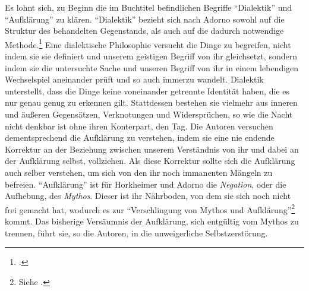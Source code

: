 \documentclass[a4paper, 12pt]{article}
\begin{document}
\begin{onehalfspace}
Es lohnt sich, zu Beginn die im Buchtitel befindlichen Begriffe "`Dialektik"' und "`Aufklärung"' zu klären. "`Dialektik"' bezieht sich nach Adorno sowohl auf die Struktur des behandelten Gegenstands, als auch auf die dadurch notwendige Methode.\footnote{\Cite[Vgl.][S. 9]{dialektik}.} Eine dialektische Philosophie versucht die Dinge zu begreifen, nicht indem sie sie definiert und unserem geistigen Begriff von ihr gleichsetzt, sondern indem sie die untersuchte Sache und unseren Begriff von ihr in einem lebendigen Wechselspiel aneinander prüft und so auch immerzu wandelt. Dialektik unterstellt, dass die Dinge keine voneinander getrennte Identität haben, die es nur genau genug zu erkennen gilt. Stattdessen bestehen sie vielmehr aus inneren und äußeren Gegensätzen, Verknotungen und Widersprüchen, so wie die Nacht nicht denkbar ist ohne ihren Konterpart, den Tag. Die Autoren versuchen dementsprechend die Aufklärung zu verstehen, indem sie eine nie endende Korrektur an der Beziehung zwischen unserem Verständnis von ihr und dabei an der Aufklärung selbst, vollziehen. Als diese Korrektur sollte sich die Aufklärung auch selber verstehen, um sich von den ihr noch immanenten Mängeln zu befreien. "`Aufklärung"' ist für Horkheimer und Adorno die \emph{Negation}, oder die Aufhebung, des \emph{Mythos}. Dieser ist ihr Nährboden, von dem sie sich noch nicht frei gemacht hat, wodurch es zur "`Verschlingung von Mythos und Aufklärung"'\footnote{Siehe \Cite{habermas}.} kommt. Das bisherige Versäumnis der Aufklärung, sich entgültig vom Mythos zu trennen, führt sie, so die Autoren, in die unweigerliche Selbstzerstörung.


\end{onehalfspace}
\end{document}
